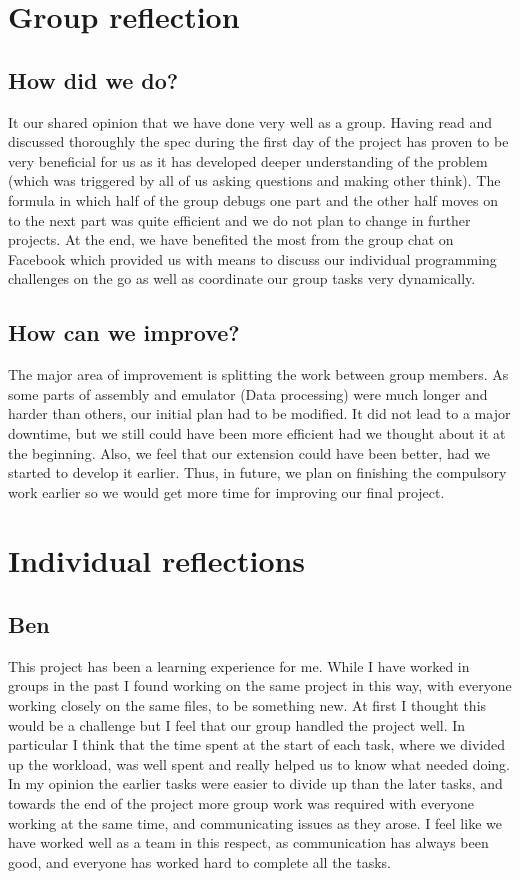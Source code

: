\documentclass[11pt]{article}
\begin{document}
\section{Group reflection}
\subsection{How did we do?}
It our shared opinion that we have done very well as a group. Having read and discussed thoroughly  the spec during the first day of the project has proven to be very beneficial for us as it has developed deeper understanding of the problem (which was triggered by all of us asking questions and making other think). The formula in which half of the group debugs one part and the other half moves on to the next part was quite efficient and we do not plan to change in further projects. At the end, we have benefited the most from the group chat on Facebook which provided us with means to discuss our individual programming challenges on the go as well as coordinate our group tasks very dynamically. 
\subsection{How can we improve?}
The major area of improvement is splitting the work between group members. As some parts of assembly and emulator (Data processing) were much longer and harder than others, our initial plan had to be modified. It did not lead to a major downtime, but we still could have been more efficient had we thought about it at the beginning. Also, we feel that our extension could have been better, had we started to develop it earlier. Thus, in future, we plan on finishing the compulsory work earlier so we would get more time for improving our final project.
\section{Individual reflections}

\subsection{Ben}
This project has been a learning experience for me. While I have worked in groups in the past I found working on the same project in this way, with everyone working closely on the same files, to be something new. At first I thought this would be a challenge but I feel that our group handled the project well. In particular I think that the time spent at the start of each task, where we divided up the workload, was well spent and really helped us to know what needed doing. In my opinion the earlier tasks were easier to divide up than the later tasks, and towards the end of the project more group work was required with everyone working at the same time, and communicating issues as they arose. I feel like we have worked well as a team in this respect, as communication has always been good, and everyone has worked hard to complete all the tasks.
\end{document}
